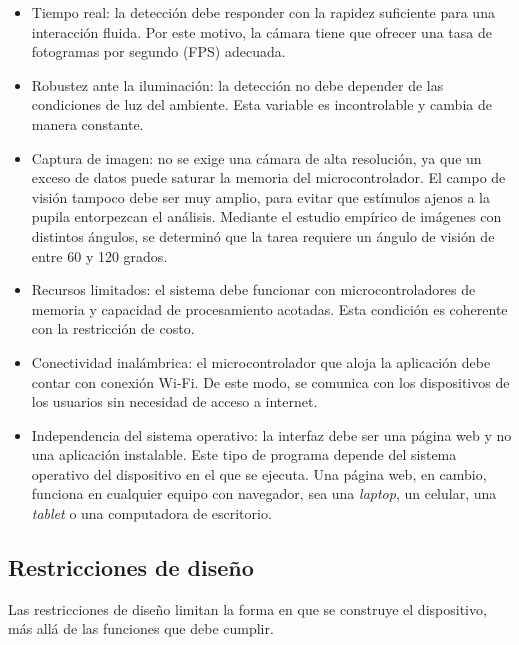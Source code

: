 \begin{itemize}

\item Tiempo real: la detección debe responder con la rapidez suficiente para una interacción fluida. Por este motivo, la cámara tiene que ofrecer una tasa de fotogramas por segundo (FPS) adecuada.

\item Robustez ante la iluminación: la detección no debe depender de las condiciones de luz del ambiente. Esta variable es incontrolable y cambia de manera constante.

\item Captura de imagen: no se exige una cámara de alta resolución, ya que un exceso de datos puede saturar la memoria del microcontrolador. El campo de visión tampoco debe ser muy amplio, para evitar que estímulos ajenos a la pupila entorpezcan el análisis. Mediante el estudio empírico de imágenes con distintos ángulos, se determinó que la tarea requiere un ángulo de visión de entre 60 y 120 grados.

\item Recursos limitados: el sistema debe funcionar con microcontroladores de memoria y capacidad de procesamiento acotadas. Esta condición es coherente con la restricción de costo.

\item Conectividad inalámbrica: el microcontrolador que aloja la aplicación debe contar con conexión Wi-Fi. De este modo, se comunica con los dispositivos de los usuarios sin necesidad de acceso a internet.

\item Independencia del sistema operativo: la interfaz debe ser una página web y no una aplicación instalable. Este tipo de programa depende del sistema operativo del dispositivo en el que se ejecuta. Una página web, en cambio, funciona en cualquier equipo con navegador, sea una \emph{laptop}, un celular, una \emph{tablet} o una computadora de escritorio.

\end{itemize}

\subsection{Restricciones de diseño}

Las restricciones de diseño limitan la forma en que se construye el dispositivo, más allá de las funciones que debe cumplir.

